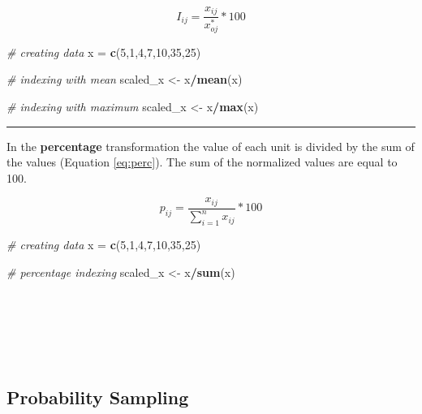 \documentclass[
]{article}
\newenvironment{Shaded}{\begin{snugshade}}{\end{snugshade}}
\newcommand{\CommentTok}[1]{\textcolor[rgb]{0.56,0.35,0.01}{\textit{#1}}}
\newcommand{\DecValTok}[1]{\textcolor[rgb]{0.00,0.00,0.81}{#1}}
\newcommand{\FunctionTok}[1]{\textcolor[rgb]{0.13,0.29,0.53}{\textbf{#1}}}
\newcommand{\NormalTok}[1]{#1}
\newcommand{\OtherTok}[1]{\textcolor[rgb]{0.56,0.35,0.01}{#1}}
\newcommand{\SpecialCharTok}[1]{\textcolor[rgb]{0.81,0.36,0.00}{\textbf{#1}}}
\begin{document}
\begin{equation}
I_{ij}=\frac{x_{ij}}{x^*_{oj}}*100
\label{eq:in}
\end{equation}

\begin{Shaded}
\begin{Highlighting}[]
\CommentTok{\# creating data}
\NormalTok{x }\OtherTok{=} \FunctionTok{c}\NormalTok{(}\DecValTok{5}\NormalTok{,}\DecValTok{1}\NormalTok{,}\DecValTok{4}\NormalTok{,}\DecValTok{7}\NormalTok{,}\DecValTok{10}\NormalTok{,}\DecValTok{35}\NormalTok{,}\DecValTok{25}\NormalTok{)}

\CommentTok{\# indexing with mean}
\NormalTok{scaled\_x }\OtherTok{\textless{}{-}}\NormalTok{ x}\SpecialCharTok{/}\FunctionTok{mean}\NormalTok{(x)}

\CommentTok{\# indexing with maximum}
\NormalTok{scaled\_x }\OtherTok{\textless{}{-}}\NormalTok{ x}\SpecialCharTok{/}\FunctionTok{max}\NormalTok{(x)}
\end{Highlighting}
\end{Shaded}

\begin{center}\rule{0.5\linewidth}{0.5pt}\end{center}

In the \textbf{percentage} transformation the value of each unit is divided
by the sum of the values (Equation \eqref{eq:perc}). The sum of the normalized
values are equal to 100.

\begin{equation}
p_{ij}=\frac{x_{ij}}{\sum^n_{i=1}x_{ij}}*100
\label{eq:perc}
\end{equation}

\begin{Shaded}
\begin{Highlighting}[]
\CommentTok{\# creating data}
\NormalTok{x }\OtherTok{=} \FunctionTok{c}\NormalTok{(}\DecValTok{5}\NormalTok{,}\DecValTok{1}\NormalTok{,}\DecValTok{4}\NormalTok{,}\DecValTok{7}\NormalTok{,}\DecValTok{10}\NormalTok{,}\DecValTok{35}\NormalTok{,}\DecValTok{25}\NormalTok{)}

\CommentTok{\# percentage indexing}
\NormalTok{scaled\_x }\OtherTok{\textless{}{-}}\NormalTok{ x}\SpecialCharTok{/}\FunctionTok{sum}\NormalTok{(x)}
\end{Highlighting}
\end{Shaded}

~

~

~

\hypertarget{probability-sampling}{%
\subsection{Probability Sampling}\label{probability-sampling}}
\end{document}
